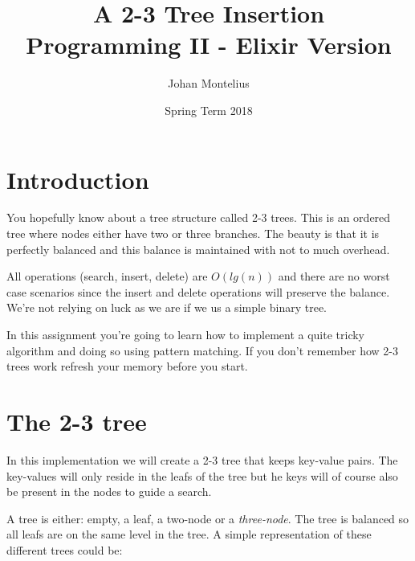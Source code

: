 \documentclass[a4paper,11pt]{article}
\begin{document}

\title{
    \textbf{A 2-3 Tree Insertion}\\
    \large{Programming II - Elixir Version}
}
\author{Johan Montelius}
\date{Spring Term 2018}
\maketitle
{}



\section*{Introduction}

You hopefully know about a tree structure called 2-3 trees. This is an
ordered tree where nodes either have two or three branches. The beauty
is that it is perfectly balanced and this balance is maintained with
not to much overhead. 

All operations (search, insert, delete) are $O(lg(n))$ and there are
no worst case scenarios since the insert and delete operations will
preserve the balance. We're not relying on luck as we are if we us a
simple binary tree.

In this assignment you're going to learn how to implement a quite
tricky algorithm and doing so using pattern matching. If you don't
remember how 2-3 trees work refresh your memory before you start.



\section{The 2-3 tree}

In this implementation we will create a 2-3 tree that keeps key-value
pairs. The key-values will only reside in the leafs of the tree but he
keys will of course also be present in the nodes to guide a search.

A tree is either: empty, a leaf, a two-node or a {\em three-node}. The
tree is balanced so all leafs are on the same level in the tree. A
simple representation of these different trees could be:
\end{document}
